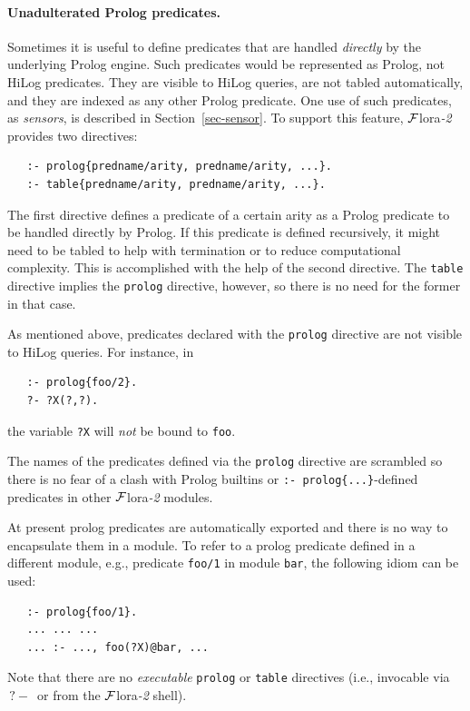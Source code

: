\documentclass[11pt]{article}
\newcommand{\FLSYSTEM}{{\mbox{\sc ${\cal F}${lora}\rm\emph{-2}}}\xspace}
\newcommand{\query}{\mbox{$\, ?\! - \, $}}                  %
\begin{document}
\paragraph{Unadulterated Prolog predicates.}
Sometimes it is useful to define predicates that are handled
\emph{directly} by the underlying Prolog engine. Such predicates would be
represented as Prolog, not HiLog predicates. They are visible to
HiLog queries, are not tabled automatically,
and they are indexed as any other Prolog predicate.
One use of such predicates, as \emph{sensors}, is described in
Section~\ref{sec-sensor}.
To support this feature, \FLSYSTEM provides two directives:
\begin{verbatim}
   :- prolog{predname/arity, predname/arity, ...}.
   :- table{predname/arity, predname/arity, ...}.
\end{verbatim}
The first directive defines a predicate of a certain arity as a Prolog
predicate to be handled directly by Prolog. If this predicate is defined
recursively, it might need to be tabled to help with termination or to
reduce computational complexity. This is accomplished with the help of the
second directive. The \texttt{table} directive implies the \texttt{prolog}
directive, however, so there is no need for the former in that case.

As mentioned above, predicates declared with the \texttt{prolog} directive
are not visible to HiLog queries. For instance, in
\begin{verbatim}
   :- prolog{foo/2}.
   ?- ?X(?,?).
\end{verbatim}
the variable \texttt{?X} will \emph{not} be bound to \texttt{foo}.  

The names of the predicates defined via the \texttt{prolog} directive 
are scrambled so there is no fear of a clash with Prolog builtins or
\texttt{:- prolog\{...\}}-defined  predicates in other \FLSYSTEM modules.

At present prolog predicates are automatically exported and there is no way
to encapsulate them in a module. To refer to a prolog predicate defined in
a different module, e.g., predicate \texttt{foo/1} in module \texttt{bar},
the following idiom can be used:
\begin{verbatim}
   :- prolog{foo/1}.
   ... ... ...
   ... :- ..., foo(?X)@bar, ...
\end{verbatim}
Note that there are no \emph{executable}  \texttt{prolog} or \texttt{table}
directives (i.e., invocable via $\query$ or from the \FLSYSTEM shell).
\end{document}
